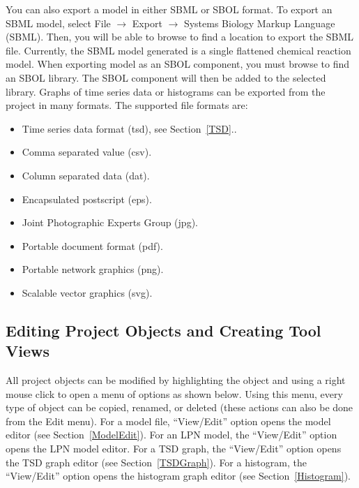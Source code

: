 \documentclass[titlepage,11pt]{article}
\begin{document}
\noindent
You can also export a model in either SBML or SBOL format.  To export an SBML model, select File $\rightarrow$ Export $\rightarrow$ Systems Biology Markup Language (SBML).  Then, you will be able to browse to find a location to export the SBML file.  Currently, the SBML model generated is a single flattened chemical reaction model.  When exporting model as an SBOL component, you must browse to find an SBOL library.  The SBOL component will then be added to the selected library.  Graphs of time series data or histograms can be exported from the project in many formats.  The supported file formats are:  
\begin{itemize}
\item Time series data format (tsd), see Section~\ref{TSD}..
\item Comma separated value (csv).
\item Column separated data (dat).
\item Encapsulated postscript (eps). 
\item Joint Photographic Experts Group (jpg). 
\item Portable document format (pdf).
\item Portable network graphics (png). 
\item Scalable vector graphics (svg).
\end{itemize}

\clearpage

\subsection{Editing Project Objects and Creating Tool Views}

\noindent
All project objects can be modified by highlighting the object and using a right mouse click to open a menu of options as shown below. Using this menu, every type of object can be copied, renamed, or deleted (these actions can also be done from the Edit menu).  For a model file, ``View/Edit'' option opens the model editor (see Section~\ref{ModelEdit}).  For an LPN model, the ``View/Edit'' option opens the LPN model editor. 
For a TSD graph, the ``View/Edit'' option opens the TSD graph editor (see Section~\ref{TSDGraph}).  For a histogram, the ``View/Edit'' option opens the histogram graph editor 
(see Section~\ref{Histogram}).  
\end{document}
